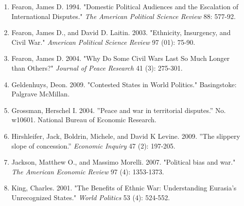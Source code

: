\documentclass[11pt,letterpaper, notitlepage]{article}
\begin{document}
\begin{enumerate}[1.]
\item \hangindent=1cm Fearon, James D.  1994.  "Domestic Political Audiences and the Escalation of International Disputes."  \emph{The American Political Science Review} 88: 577-92.

\item \hangindent=1cm Fearon, James D., and David D. Laitin. 2003. "Ethnicity, Insurgency, and Civil War." \emph {American Political Science Review} 97 (01): 75-90.

\item \hangindent=1cm Fearon, James D. 2004. "Why Do Some Civil Wars Last So Much Longer than Others?" \emph {Journal of Peace Research} 41 (3): 275-301.

\item \hangindent=1cm Geldenhuys, Deon. 2009. "Contested States in World Politics." Basingstoke: Palgrave McMillan.




\item \hangindent=1cm Grossman, Herschel I. 2004. ''Peace and war in territorial disputes.'' No. w10601. National Bureau of Economic Research.

\item \hangindent=1cm Hirshleifer, Jack, Boldrin, Michele, and David K Levine. 2009. ''The slippery slope of concession.'' \emph{Economic Inquiry} 47 (2): 197-205.

\item \hangindent=1cm Jackson, Matthew O., and Massimo Morelli. 2007. "Political bias and war." \emph{The American Economic Review} 97 (4): 1353-1373.

\item \hangindent=1cm King, Charles. 2001. "The Benefits of Ethnic War: Understanding Eurasia's Unrecognized States." \emph{World Politics} 53 (4): 524-552.


\end{enumerate}
\end{document}
